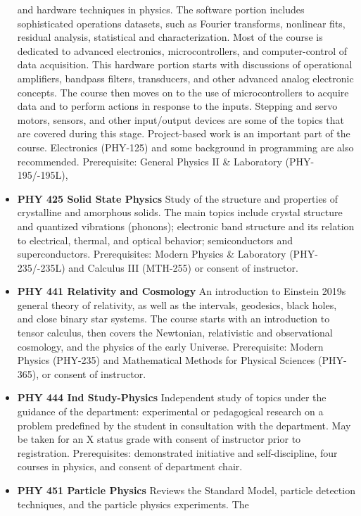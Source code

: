 \documentclass[
  letterpaper,
]{scrbook}
\begin{document}
\begin{itemize}
  and hardware techniques in physics. The software portion includes
  sophisticated operations datasets, such as Fourier transforms,
  nonlinear fits, residual analysis, statistical and characterization.
  Most of the course is dedicated to advanced electronics,
  microcontrollers, and computer-control of data acquisition. This
  hardware portion starts with discussions of operational amplifiers,
  bandpass filters, transducers, and other advanced analog electronic
  concepts. The course then moves on to the use of microcontrollers to
  acquire data and to perform actions in response to the inputs.
  Stepping and servo motors, sensors, and other input/output devices are
  some of the topics that are covered during this stage. Project-based
  work is an important part of the course. Electronics (PHY-125) and
  some background in programming are also recommended. Prerequisite:
  General Physics II \& Laboratory (PHY-195/-195L),
\item
  \textbf{PHY 425 Solid State Physics} Study of the structure and
  properties of crystalline and amorphous solids. The main topics
  include crystal structure and quantized vibrations (phonons);
  electronic band structure and its relation to electrical, thermal, and
  optical behavior; semiconductors and superconductors. Prerequisites:
  Modern Physics \& Laboratory (PHY-235/-235L) and Calculus III
  (MTH-255) or consent of instructor.
\item
  \textbf{PHY 441 Relativity and Cosmology} An introduction to Einstein
  2019s general theory of relativity, as well as the intervals,
  geodesics, black holes, and close binary star systems. The course
  starts with an introduction to tensor calculus, then covers the
  Newtonian, relativistic and observational cosmology, and the physics
  of the early Universe. Prerequisite: Modern Physics (PHY-235) and
  Mathematical Methods for Physical Sciences (PHY-365), or consent of
  instructor.
\item
  \textbf{PHY 444 Ind Study-Physics} Independent study of topics under
  the guidance of the department: experimental or pedagogical research
  on a problem predefined by the student in consultation with the
  department. May be taken for an X status grade with consent of
  instructor prior to registration. Prerequisites: demonstrated
  initiative and self-discipline, four courses in physics, and consent
  of department chair.
\item
  \textbf{PHY 451 Particle Physics} Reviews the Standard Model, particle
  detection techniques, and the particle physics experiments. The

\end{itemize}
\end{document}

